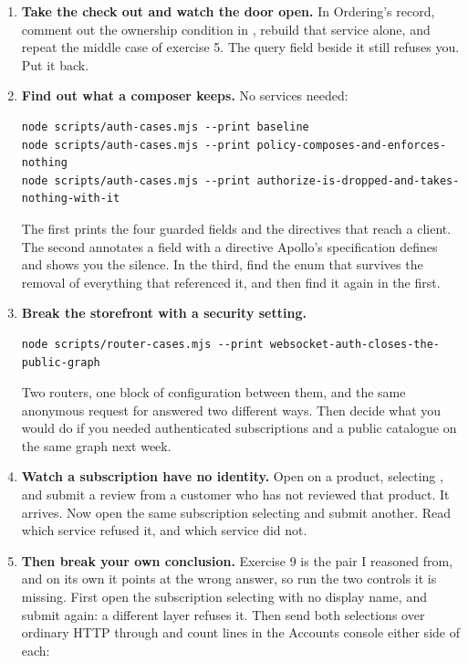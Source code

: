 \begin{enumerate}
  \item \textbf{Take the check out and watch the door open.} In Ordering's
   record, comment out the ownership condition in
  , rebuild that service alone, and repeat the
  middle case of exercise 5. The query field beside it still refuses you. Put
  it back.

  \item \textbf{Find out what a composer keeps.} No services needed:

  \begin{verbatim}
node scripts/auth-cases.mjs --print baseline
node scripts/auth-cases.mjs --print policy-composes-and-enforces-nothing
node scripts/auth-cases.mjs --print authorize-is-dropped-and-takes-nothing-with-it
  \end{verbatim}

  The first prints the four guarded fields and the directives that reach a
  client. The second annotates a field with a directive Apollo's specification
  defines and shows you the silence. In the third, find the enum that survives
  the removal of everything that referenced it, and then find it again in the
  first.

  \item \textbf{Break the storefront with a security setting.}

  \begin{verbatim}
node scripts/router-cases.mjs --print websocket-auth-closes-the-public-graph
  \end{verbatim}

  Two routers, one block of configuration between them, and the same anonymous
  request for  answered two different ways. Then decide what
  you would do if you needed authenticated subscriptions and a public catalogue
  on the same graph next week.

  \item \textbf{Watch a subscription have no identity.} Open
   on a product, selecting ,
  and submit a review from a customer who has not reviewed that product. It
  arrives. Now open the same subscription selecting
   and submit another. Read which service
  refused it, and which service did not.

  \item \textbf{Then break your own conclusion.} Exercise 9 is the pair I
  reasoned from, and on its own it points at the wrong answer, so run the two
  controls it is missing. First open the subscription selecting
   with no display name, and submit again: a different
  layer refuses it. Then send both selections over ordinary HTTP through
   and count  lines in the
  Accounts console either side of each:


\end{enumerate}
